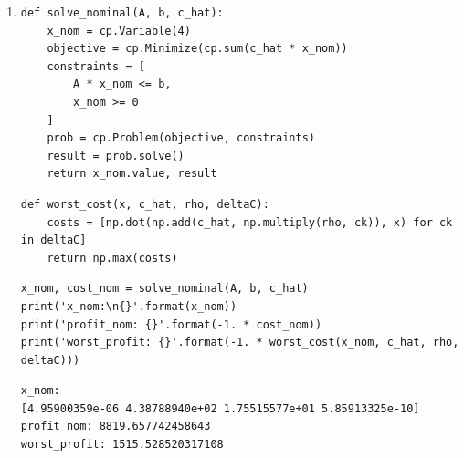 \documentclass[11pt]{article}
\begin{document}
\begin{solution}
\begin{enumerate}
    \item
        \begin{verbatim}
def solve_nominal(A, b, c_hat):
    x_nom = cp.Variable(4)
    objective = cp.Minimize(cp.sum(c_hat * x_nom))
    constraints = [
        A * x_nom <= b,
        x_nom >= 0
    ]
    prob = cp.Problem(objective, constraints)
    result = prob.solve()
    return x_nom.value, result
        \end{verbatim}
        \begin{verbatim}
def worst_cost(x, c_hat, rho, deltaC):
    costs = [np.dot(np.add(c_hat, np.multiply(rho, ck)), x) for ck in deltaC]
    return np.max(costs)
        \end{verbatim}
        \begin{verbatim}
x_nom, cost_nom = solve_nominal(A, b, c_hat)
print('x_nom:\n{}'.format(x_nom))
print('profit_nom: {}'.format(-1. * cost_nom))
print('worst_profit: {}'.format(-1. * worst_cost(x_nom, c_hat, rho, deltaC)))
        \end{verbatim}
        \begin{verbatim}
x_nom:
[4.95900359e-06 4.38788940e+02 1.75515577e+01 5.85913325e-10]
profit_nom: 8819.657742458643
worst_profit: 1515.528520317108
        \end{verbatim}


\end{enumerate}
\end{solution}
\end{document}

